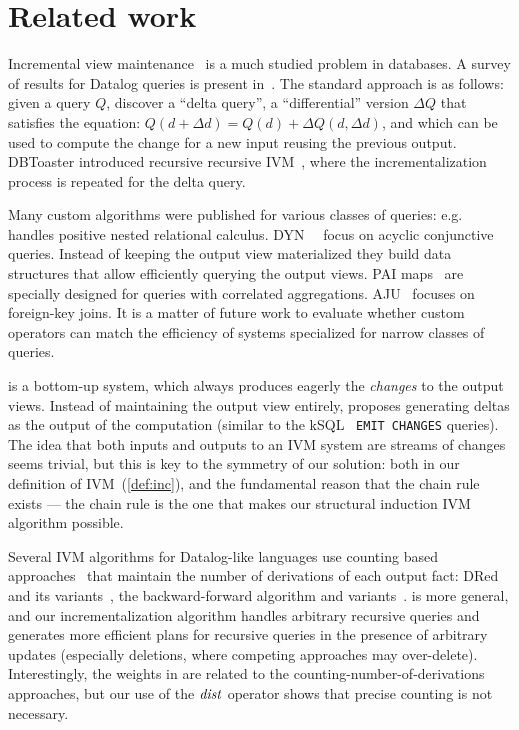 \section{Related work}\label{sec:related}

Incremental view
maintenance~\cite{gupta-sigmod93,griffin-sigmod95,chaudhuri-icde95,gupta-idb95,chirkova-book12}
is a much studied problem in databases.  A survey of results for
Datalog queries is present in~\cite{motik-ai19}.  The standard
approach is as follows: given a query $Q$, discover a ``delta query'',
a ``differential'' version $\Delta Q$ that satisfies the equation:
$Q(d+\Delta d)=Q(d)+\Delta Q(d,\Delta d)$, and which can be used to
compute the change for a new input reusing the previous output.
DBToaster introduced recursive recursive
IVM~\cite{ahmad-vldb09,koch-pods10}, where the incrementalization
process is repeated for the delta query.

Many custom algorithms were published for various classes of queries:
e.g.~\cite{koch-pods16} handles positive nested relational calculus.
DYN~\cite{idris-sigmod17,idris-vldb18}~\cite{idris-sigmod19} focus on acyclic
conjunctive queries.  Instead of keeping the output view materialized
they build data structures that allow efficiently querying the output
views.  PAI maps~\cite{abeysinghe-sigmod22} are specially designed for
queries with correlated aggregations.  AJU~\cite{wang-sigmod20}
focuses on foreign-key joins.  It is a matter of future work to
evaluate whether custom \dbsp operators can match the efficiency of
systems specialized for narrow classes of queries.

\dbsp is a bottom-up system, which always produces eagerly
the \emph{changes} to the output views.
Instead of maintaining the output view entirely, \dbsp proposes
generating deltas as the output of the computation (similar to the kSQL~\cite{jafarpour-edbt19}
\texttt{EMIT CHANGES} queries).  The idea that both
inputs and outputs to an IVM system are streams of changes
seems trivial, but this is key to the symmetry of our solution:
both in our definition of IVM~(\ref{def:inc}), and the fundamental
reason that the chain rule exists --- the chain rule is the one that makes our
structural induction IVM algorithm possible.

Several IVM algorithms for Datalog-like languages use counting based
approaches~\cite{Dewan-iis92,motik-aaai15} that maintain the number of
derivations of each output fact: DRed~\cite{gupta-sigmod93} and its
variants~\cite{Ceri-VLDB91,Wolfson-sigmod91,Staudt-vldb96,Kotowski-rr11,Lu-sigmod95,Apt-sigmod87},
the backward-forward algorithm and
variants~\cite{motik-aaai15,Harrison-wdd92,motik-ai19}.  \dbsp is more
general, and our incrementalization algorithm handles arbitrary
recursive queries and generates more efficient plans for recursive
queries in the presence of arbitrary updates (especially deletions,
where competing approaches may over-delete).  Interestingly, the \zrs
weights in \dbsp are related to the counting-number-of-derivations
approaches, but our use of the $\mathit{dist}$ operator shows that precise
counting is not necessary.

